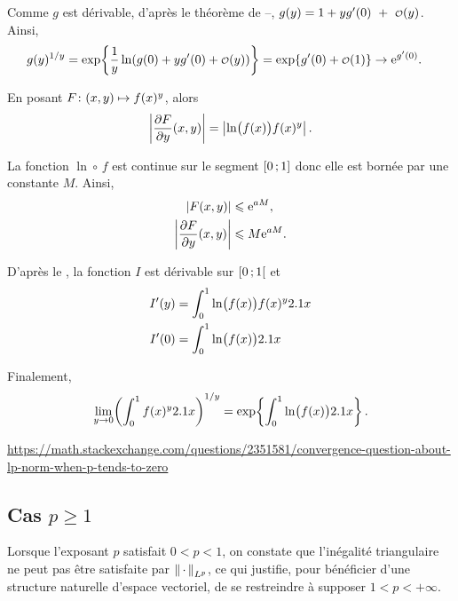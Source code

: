 \begin{solution}
\begin{reponses}
\item Comme $g$ est dérivable, d'après le théorème de --, $g(y) = 1 + y g'(0)~+~\petito(y)$. Ainsi,
\begin{align*}
g(y)^{1/y} &= \exp\mathopen{}\left\{\frac{1}{y} \ln(g(0) + y g'(0) + \petito(y))\right\}
= \exp\mathopen{}\left\{g'(0) + \petito(1)\right\}
\to \e^{g'(0)}.
\end{align*}

\item En posant $\fonctionligne[F]{(x, y)}{f(x)^y}$, alors
\[
\module{\frac{\partial F}{\partial y}(x, y)} = \module{\ln\mathopen{}\big(f(x)\big) f(x)^y}.
\]

La fonction $\ln \circ\, f$ est continue sur le segment $\interff{0}{1}$ donc elle est bornée par une constante $M$. Ainsi,
\begin{align*}
\module{F(x, y)} &\leqslant \e^{a M},\\
\module{\frac{\partial F}{\partial y}(x, y)} &\leqslant M \e^{a M}.
\end{align*}

D'après le , la fonction $I$ est dérivable sur $\interfo{0}{1}$ et
\begin{align*}
I'(y) &= \int_0^1 \ln\mathopen{}\big(f(x)\big) f(x)^y \d x \\
I'(0) &= \int_0^1 \ln\mathopen{}\big(f(x)\big) \d x
\end{align*}

\item Finalement,
\[
\lim_{y\to0} \mathopen{}\left(\int_0^1 f(x)^y \d x\right)^{1/y} = \exp\mathopen{}\left\{\int_0^1 \ln\mathopen{}\big(f(x)\big) \d x\right\}.
\]
\end{reponses}
\end{solution}

\url{https://math.stackexchange.com/questions/2351581/convergence-question-about-lp-norm-when-p-tends-to-zero}


\subsection{Cas $p \geqslant 1$}

Lorsque l'exposant $p$ satisfait $0 < p < 1$, on constate que l'inégalité triangulaire ne peut pas être satisfaite par $\norm{\,\cdot\,}_{L^p}$, ce qui justifie, pour bénéficier d’une structure naturelle d’espace vectoriel, de se restreindre à supposer $1 < p < +\infty$.

